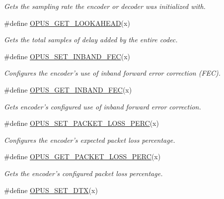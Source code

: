 \begin{DoxyCompactItemize}
\begin{DoxyCompactList}\small\item\em Gets the sampling rate the encoder or decoder was initialized with. \item\end{DoxyCompactList}\item 
\#define \hyperlink{group__opus__encoderctls_gaf81b9e01501910adc67195ebb42b4a54}{OPUS\_\-GET\_\-LOOKAHEAD}(x)
\begin{DoxyCompactList}\small\item\em Gets the total samples of delay added by the entire codec. \item\end{DoxyCompactList}\item 
\#define \hyperlink{group__opus__encoderctls_ga5b67dc832aa46c1c2f35752c46380545}{OPUS\_\-SET\_\-INBAND\_\-FEC}(x)
\begin{DoxyCompactList}\small\item\em Configures the encoder's use of inband forward error correction (FEC). \item\end{DoxyCompactList}\item 
\#define \hyperlink{group__opus__encoderctls_gaf792b27a6277ddf786413dbf472d0ac8}{OPUS\_\-GET\_\-INBAND\_\-FEC}(x)
\begin{DoxyCompactList}\small\item\em Gets encoder's configured use of inband forward error correction. \item\end{DoxyCompactList}\item 
\#define \hyperlink{group__opus__encoderctls_gafda1c951dea919ba54432cd03827f1a9}{OPUS\_\-SET\_\-PACKET\_\-LOSS\_\-PERC}(x)
\begin{DoxyCompactList}\small\item\em Configures the encoder's expected packet loss percentage. \item\end{DoxyCompactList}\item 
\#define \hyperlink{group__opus__encoderctls_gaa79261c6a55444993fca8d3a3a29d519}{OPUS\_\-GET\_\-PACKET\_\-LOSS\_\-PERC}(x)
\begin{DoxyCompactList}\small\item\em Gets the encoder's configured packet loss percentage. \item\end{DoxyCompactList}\item 
\#define \hyperlink{group__opus__encoderctls_ga4f053b2db8c5162293213aabfe123773}{OPUS\_\-SET\_\-DTX}(x)

\end{DoxyCompactItemize}
